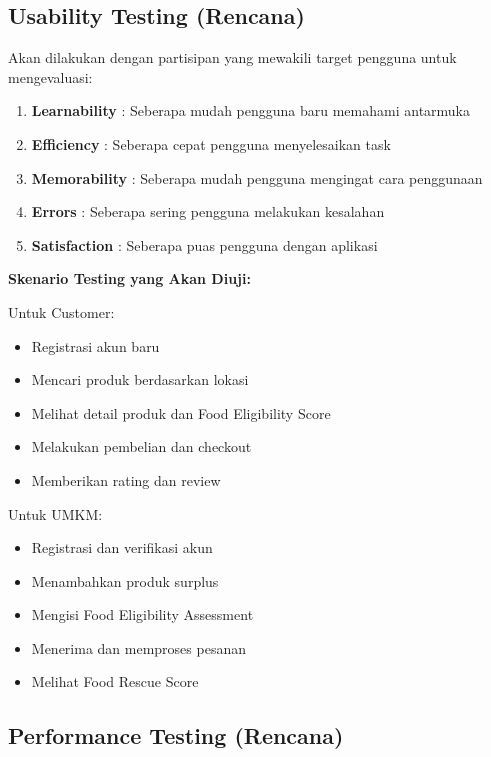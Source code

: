 \subsection{Usability Testing (Rencana)}

Akan dilakukan dengan partisipan yang mewakili target pengguna untuk mengevaluasi:

\begin{enumerate}[leftmargin=*]
    \item \textbf{Learnability} : Seberapa mudah pengguna baru memahami antarmuka
    \item \textbf{Efficiency} : Seberapa cepat pengguna menyelesaikan task
    \item \textbf{Memorability} : Seberapa mudah pengguna mengingat cara penggunaan
    \item \textbf{Errors} : Seberapa sering pengguna melakukan kesalahan
    \item \textbf{Satisfaction} : Seberapa puas pengguna dengan aplikasi
\end{enumerate}

\textbf{Skenario Testing yang Akan Diuji:}

Untuk Customer:
\begin{itemize}[leftmargin=*]
    \item Registrasi akun baru
    \item Mencari produk berdasarkan lokasi
    \item Melihat detail produk dan Food Eligibility Score
    \item Melakukan pembelian dan checkout
    \item Memberikan rating dan review
\end{itemize}

Untuk UMKM:
\begin{itemize}[leftmargin=*]
    \item Registrasi dan verifikasi akun
    \item Menambahkan produk surplus
    \item Mengisi Food Eligibility Assessment
    \item Menerima dan memproses pesanan
    \item Melihat Food Rescue Score
\end{itemize}

\subsection{Performance Testing (Rencana)}

